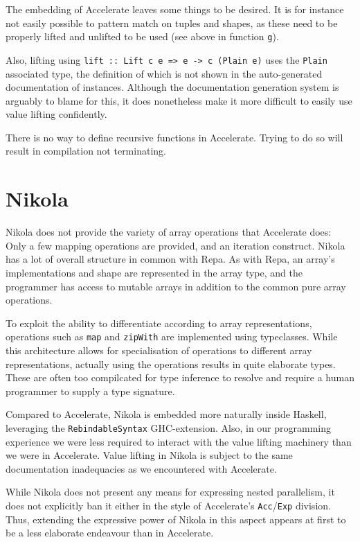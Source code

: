 The embedding of Accelerate leaves some things to be desired. It is for
instance not easily possible to pattern match on tuples and shapes, as these
need to be properly lifted and unlifted to be used (see above in function \texttt{g}).

Also, lifting using \texttt{lift :: Lift c e => e -> c (Plain e)} uses the
\texttt{Plain} associated type, the definition of which is not shown in the
auto-generated documentation of instances. Although the documentation
generation system is arguably to blame for this, it does nonetheless make it
more difficult to easily use value lifting confidently.

There is no way to define recursive functions in Accelerate. Trying to do so
will result in compilation not terminating.

\section{Nikola}

Nikola does not provide the variety of array operations that Accelerate does: Only
a few mapping operations are provided, and an iteration construct.  Nikola has
a lot of overall structure in common with Repa. As with Repa, an array's
implementations and shape are represented in the array type, and the programmer
has access to mutable arrays in addition to the common pure array operations.

To exploit the ability to differentiate according to array representations,
operations such as \texttt{map} and \texttt{zipWith} are implemented using
typeclasses.  While this architecture allows for specialisation of operations
to different array representations, actually using the operations results in quite
elaborate types. These are often too compilcated for type inference to resolve
and require a human programmer to supply a type signature.


Compared to Accelerate, Nikola is embedded more naturally inside Haskell,
leveraging the \texttt{RebindableSyntax} GHC-extension. Also, in our programming
experience we were less required to interact with the value lifting machinery
than we were in Accelerate. Value lifting in Nikola is subject to the same
documentation inadequacies as we encountered with Accelerate.

While Nikola does not present any means for expressing nested parallelism, it
does not explicitly ban it either in the style of Accelerate's
\texttt{Acc}/\texttt{Exp} division. Thus, extending the expressive power of
Nikola in this aspect appears at first to be a less elaborate endeavour than in
Accelerate.

